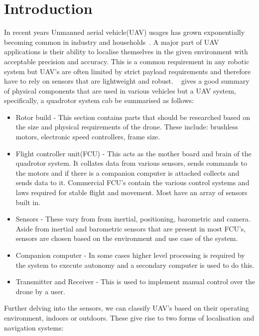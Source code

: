     \chapter{Introduction}\label{ch:introduction}
    In recent years Unmanned aerial vehicle(UAV) usages has grown exponentially becoming common in industry and households~\parencite{custers2016drones}.
    A major part of UAV applications is their ability to localise themselves in the given environment with acceptable precision and accuracy.
    This is a common requirement in any robotic system but UAV's are often limited by strict payload requirements and therefore have to rely on sensors that are lightweight and robust.
    ~\textcite{ardupilotadvanced} gives a good summary of physical components that are used in various vehicles but a UAV system, specifically, a quadrotor system cab be summarised as follows:
    \begin{itemize}
        \item Rotor build - This section contains parts that should be researched based on the size and physical requirements of the drone.
        These include: brushless motors, electronic speed controllers, frame size.
        \item Flight controller unit(FCU) - This acts as the mother board and brain of the quadrotor system.
        It collates data from various sensors, sends commands to the motors and if there is a companion computer is attached collects and sends data to it.
        Commercial FCU's contain the various control systems and laws required for stable flight and movement.
        Most have an array of sensors built in.
        \item Sensors - These vary from from inertial, positioning, barometric and camera.
        Aside from inertial and barometric sensors that are present in most FCU's, sensors are chosen based on the environment and use case of the system.
        \item Companion computer - In some cases higher level processing is required by the system to execute autonomy and a secondary computer is used to do this.
        \item Transmitter and Receiver - This is used to implement manual control over the drone by a user.
    \end{itemize}
    Further delving into the sensors, we can classify UAV's based on their operating environment, indoors or outdoors.
    These give rise to two forms of localisation and navigation systems:

